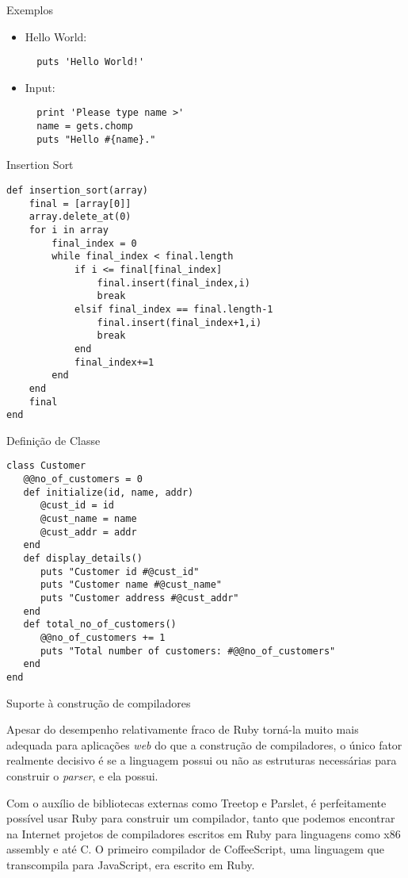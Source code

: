 \documentclass{beamer}
\begin{document}
\begin{frame}[fragile]{Exemplos}
\begin{itemize}
\item Hello World:
\begin{verbatim}
  puts 'Hello World!'
\end{verbatim}
\item Input:
\begin{verbatim}
  print 'Please type name >'
  name = gets.chomp
  puts "Hello #{name}."
\end{verbatim}
\end{itemize}
\end{frame}
\begin{frame}[fragile]{Insertion Sort}
\begingroup
\fontsize{10pt}{11pt}
\begin{verbatim}
def insertion_sort(array)
    final = [array[0]]
    array.delete_at(0)
    for i in array
        final_index = 0
        while final_index < final.length
            if i <= final[final_index]
                final.insert(final_index,i)
                break
            elsif final_index == final.length-1
                final.insert(final_index+1,i)
                break
            end
            final_index+=1
        end
    end
    final
end
\end{verbatim}
\endgroup
\end{frame}
\begin{frame}[fragile]{Definição de Classe}
\begingroup
\fontsize{10pt}{11pt}
\begin{verbatim}
class Customer
   @@no_of_customers = 0
   def initialize(id, name, addr)
      @cust_id = id
      @cust_name = name
      @cust_addr = addr
   end
   def display_details()
      puts "Customer id #@cust_id"
      puts "Customer name #@cust_name"
      puts "Customer address #@cust_addr"
   end
   def total_no_of_customers()
      @@no_of_customers += 1
      puts "Total number of customers: #@@no_of_customers"
   end
end
\end{verbatim}
\endgroup
\end{frame}

\begin{frame}{Suporte à construção de compiladores}

Apesar do desempenho relativamente fraco de Ruby torná-la muito mais adequada para aplicações \textit{web} do que a construção de compiladores, o único fator realmente decisivo é se a linguagem possui ou não as estruturas necessárias para construir o \textit{parser}, e ela possui.

Com o auxílio de bibliotecas externas como Treetop e Parslet, é perfeitamente possível usar Ruby para construir um compilador, tanto que podemos encontrar na Internet projetos de compiladores escritos em Ruby para linguagens como x86 assembly e até C. O primeiro compilador de CoffeeScript, uma linguagem que transcompila para JavaScript, era escrito em Ruby.

\end{frame}
\end{document}
